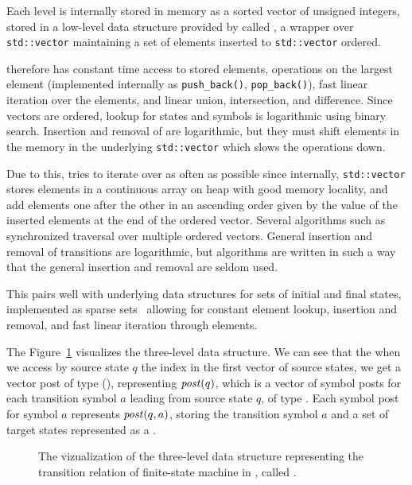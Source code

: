 Each level is internally stored in memory as a sorted vector of unsigned integers, stored in a low-level data structure provided by \mata called \ordvector, a wrapper over \texttt{std::vector} maintaining a set of elements inserted to \texttt{std::vector} ordered.

\ordvector therefore has constant time access to stored elements, operations on the largest element (implemented internally as \texttt{push\_back()}, \texttt{pop\_back()}), fast linear iteration over the elements, and linear union, intersection, and difference.
Since vectors are ordered, lookup for states and symbols is logarithmic using binary search.
Insertion and removal of are logarithmic, but they must shift elements in the memory in the underlying \texttt{std::vector} which slows the operations down.

Due to this, \mata tries to iterate over \ordvector as often as possible since internally, \texttt{std::vector} stores elements in a continuous array on heap with good memory locality, and add elements one after the other in an ascending order given by the value of the inserted elements at the end of the ordered vector.
Several algorithms such as synchronized traversal over multiple ordered vectors.
General insertion and removal of transitions are logarithmic, but \mata algorithms are written in such a way that the general insertion and removal are seldom used.

This pairs well with underlying data structures for sets of initial and final states, implemented as sparse sets~\cite{sparseset93} allowing for constant element lookup, insertion and removal, and fast linear iteration through elements.

The Figure~\ref{fig:delta_struct} visualizes the three-level \deltastruct data structure. We can see that the when we access by source state $q$ the index in the first vector of source states, we get a vector post of type \statepost (\statepost[q]), representing $\mathit{post}(q)$, which is a vector of symbol posts for each transition symbol $a$ leading from source state $q$, of type \symbolpost.
Each symbol post for symbol $a$ represents $\mathit{post}(q, a)$, storing the transition symbol $a$ and a set of target states represented as a \ordvector.

\begin{figure}[ht]
\begin{center}

\end{center}
\caption{
The vizualization of the three-level data structure representing the transition relation of finite-state machine in \mata, called \deltastruct.
}
\label{fig:delta_struct}
\end{figure}

